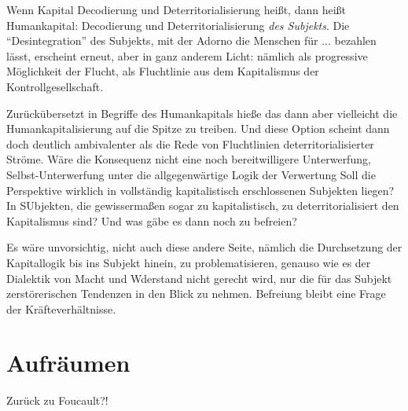\documentclass[12pt,
               DIV13,
               paper=a4,
               twoside=false,
               onehalfspacing,
               bibliography=totoc,
               toc=graduated,
               draft,
               ]{scrartcl}
\newcommand{\worries}[1]{\ifdraft{\textcolor{blue}{\texttt{(#1)}}}{}}
\begin{document}
Wenn Kapital Decodierung und Deterritorialisierung heißt, dann heißt
Humankapital: Decodierung und Deterritorialisierung \emph{des
Subjekts}. Die "`Desintegration"' des Subjekts, mit der Adorno die
Menschen für ... bezahlen lässt, erscheint erneut, aber in ganz
anderem Licht: nämlich als progressive Möglichkeit der Flucht, als
Fluchtlinie aus dem Kapitalismus der Kontrollgesellschaft.

Zurückübersetzt in Begriffe des Humankapitals hieße das dann aber
vielleicht die Humankapitalisierung auf die Spitze zu treiben. Und
diese Option scheint dann doch deutlich ambivalenter als die Rede von
Fluchtlinien deterritorialisierter Ströme. Wäre die Konsequenz nicht
eine noch bereitwilligere Unterwerfung, Selbst-Unterwerfung unter die
allgegenwärtige Logik der Verwertung Soll die Perspektive wirklich in
vollständig kapitalistisch erschlossenen Subjekten liegen? In
SUbjekten, die gewissermaßen sogar zu kapitalistisch, zu
deterritorialisiert den Kapitalismus sind? Und was gäbe es dann noch
zu befreien? \worries{"`vorsubjektive Einheiten"'}

Es wäre unvorsichtig, nicht auch diese andere Seite, nämlich die
Durchsetzung der Kapitallogik bis ins Subjekt hinein, zu
problematisieren, genauso wie es der Dialektik von Macht und Wderstand
nicht gerecht wird, nur die für das Subjekt zerstörerischen Tendenzen
in den Blick zu nehmen. Befreiung bleibt eine Frage der
Kräfteverhältnisse.


\section{Aufräumen}

Zurück zu Foucault?!


\newpage
\printshorthands
\printbibliography
\end{document}

